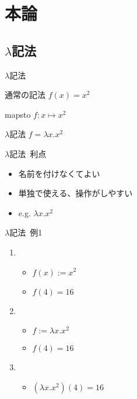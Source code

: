 \documentclass[pdflatex,17pt]{beamer}
\begin{document}
\section{本論}

\subsection{$\lambda$記法}
\subsectionpage
\begin{frame}{$\lambda$記法}
    \begin{block}{通常の記法}
        $f(x) = x^2$
    \end{block}
    \begin{block}{mapsto}
        $f : x \mapsto x^2$
    \end{block}
    \begin{block}{$\lambda$記法}
        $f = \lambda x. x^2$
    \end{block}
\end{frame}

\begin{frame}{$\lambda$記法~利点}
    \begin{itemize}
        \item 名前を付けなくてよい
        \item 単独で使える、操作がしやすい
        \item e.g. $\lambda x. x^2$
    \end{itemize}
\end{frame}

\begin{frame}{$\lambda$記法~例1}
    \begin{enumerate}
        \item \begin{itemize}
            \item $f(x) := x^2$
            \item $f(4) = 16$
        \end{itemize}
        \item \begin{itemize}
            \item $f := \lambda x. x^2$
            \item $f(4) = 16$
        \end{itemize}
        \item \begin{itemize}
            \item $(\lambda x. x^2)(4) = 16$
        \end{itemize}
    \end{enumerate}
\end{frame}
\end{document}
